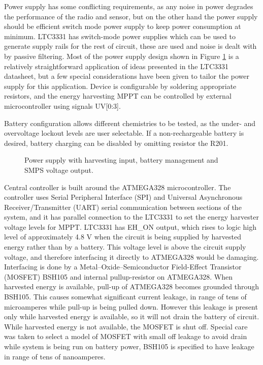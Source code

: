 Power supply has some conflicting requirements, as any noise in power degrades the performance of the radio and sensor, but on the other hand the power supply should be efficient switch mode power supply to keep power consumption at minimum. LTC3331 has switch-mode power supplies which can be used to generate supply rails for the rest of circuit, these are used and noise is dealt with by passive filtering. Most of the power supply design shown in Figure \ref{fig:psu_circuit} is a relatively straightforward application of ideas presented in the LTC3331 datasheet, but a few special considerations have been given to tailor the power supply for this application. Device is configurable by soldering appropriate resistors, and the energy harvesting MPPT can be controlled by external microcontroller using signals UV[0:3]. 

Battery configuration allows different chemistries to be tested, as the under- and overvoltage lockout levels are user selectable. If a non-rechargeable battery is desired, battery charging can be disabled by omitting resistor the R201. 

\begin{figure}[htb]
    \centering
    \def\svgwidth{\columnwidth}
    
    \caption{\label{fig:psu_circuit} Power supply with harvesting input, battery management and SMPS voltage output.}
\end{figure}

Central controller is built around the ATMEGA328 \cite{atmega328} microcontroller. The controller uses Serial Peripheral Interface (SPI) and Universal Asynchronous Receiver/Transmitter (UART) serial communication between sections of the system, and it has parallel connection to the LTC3331 to set the energy harvester voltage levels for MPPT. LTC3331 has EH\_ON output, which rises to logic high level of approximately 4.8 V when the circuit is being supplied by harvested energy rather than by a battery. This voltage level is above the circuit supply voltage, and therefore interfacing it directly to ATMEGA328 would be damaging. Interfacing is done by a Metal–Oxide–Semiconductor Field-Effect Transistor (MOSFET) BSH105 \cite{BSH105} and internal pullup-resistor on ATMEGA328. When harvested energy is available, pull-up of ATMEGA328 becomes grounded through BSH105. This causes somewhat significant current leakage, in range of tens of microamperes while pull-up is being pulled down. However this leakage is present only while harvested energy is available, so it will not drain the battery of circuit. While harvested energy is not available, the MOSFET is shut off. Special care was taken to select a model of MOSFET with small off leakage to avoid drain while system is being run on battery power, BSH105 is specified to have leakage in range of tens of nanoamperes. 

